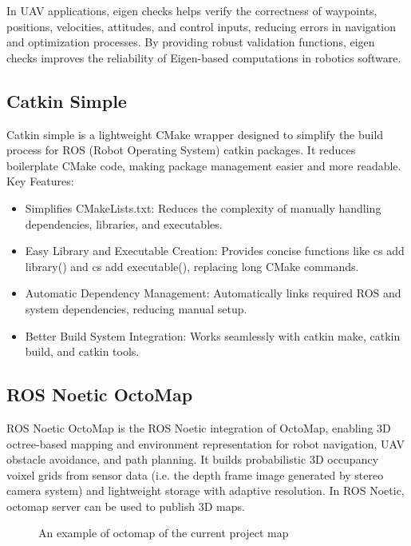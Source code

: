 \documentclass{article}
\begin{document}
In UAV applications, eigen checks helps verify the correctness of waypoints, positions, velocities, attitudes, and control inputs, reducing errors in navigation and optimization processes.
By providing robust validation functions, eigen checks improves the reliability of Eigen-based computations in robotics software.


\subsection{Catkin Simple}
Catkin simple is a lightweight CMake wrapper designed to simplify the build process for ROS (Robot Operating System) catkin packages. It reduces boilerplate CMake code, making package management easier and more readable.
Key Features:
\begin{itemize}
    \item Simplifies CMakeLists.txt: Reduces the complexity of manually handling dependencies, libraries, and executables.
    \item Easy Library and Executable Creation: Provides concise functions like cs add library() and cs add executable(), replacing long CMake commands.
    \item Automatic Dependency Management: Automatically links required ROS and system dependencies, reducing manual setup.
    \item Better Build System Integration: Works seamlessly with catkin make, catkin build, and catkin tools.
\end{itemize}

\subsection{ROS Noetic OctoMap}
ROS Noetic OctoMap is the ROS Noetic integration of OctoMap, enabling 3D octree-based mapping and environment representation for robot navigation, UAV obstacle avoidance, and path planning. It builds probabilistic 3D occupancy voixel grids from sensor data (i.e. the depth frame image generated by stereo camera system) and lightweight storage with adaptive resolution. In ROS Noetic, octomap server can be used to publish 3D maps. 
\begin{figure}[h]
    \centering
    \caption{An example of octomap of the current project map}
    \label{fig:two_images}
\end{figure}
\end{document}
